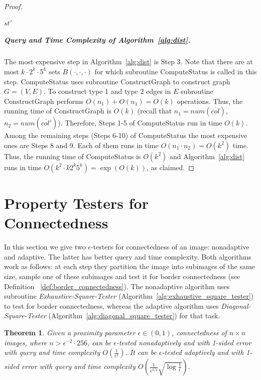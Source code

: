 \documentclass[11pt,english]{article}
\newtheorem{theorem}{Theorem}[section]
\numberwithin{figure}{section}
\newcommand{\eps}{{\epsilon}}
\newcommand{\Compst}{{\sf ComputeStatus}\xspace}
\newcommand{\Constgr}{{\sf ConstructGraph}\xspace}
\begin{document}
\begin{proof}
\begin{algorithm}
\nl \Return $\overline{st'}$

\end{algorithm}


\subparagraph{Query and Time Complexity of Algorithm~\ref{alg:dist}.}
The most expensive step in Algorithm~\ref{alg:dist} is Step 3. Note that there are at most $k\cdot2^k\cdot5^k$ sets $B(\cdot,\cdot,\cdot)$ for which subroutine \Compst is called in this step. \Compst uses subroutine \Constgr to construct graph $G=(V,E)$. To construct type 1 and type 2 edges in $E$ subroutine \Constgr performs $O(n_1)+O(n_1)=O(k)$ operations. Thus, the running time of \Constgr is $O(k)$ (recall that $n_1=num(\overline{col})$, $n_2=num(\overline{col'})$). Therefore, Steps 1-5 of \Compst run in time $O(k)$. Among the remaining steps (Steps 6-10) of \Compst the most expensive ones are Steps 8 and 9. Each of them runs in time $O(n_1\cdot n_2)=O(k^2)$ time. Thus, the running time of \Compst is $O(k^2)$ and Algorithm~\ref{alg:dist} runs in time $O( k^2\cdot k2^k5^k)=\exp \left (O(k)\right)$, as claimed.
\end{proof}



\iffalse
\section{Property Testers for Connectedness}\label{tester_for_connectedness}
In this section we give two $\eps$-testers
for connectedness of an image: nonadaptive and adaptive. The latter has better
query and time complexity. Both algorithms work as follows: at each step they
partition the image into subimages of the same size, sample one of these
subimages and test it for  border connectedness (see Definition~
\ref{def:border_connectedness}). The nonadaptive algorithm uses subroutine \emph{Exhaustive-Square-Tester}
(Algorithm~\ref{alg:exhaustive_square_tester}) to test for border connectedness, whereas the adaptive algorithm uses \emph{Diagonal-Square-Tester} (Algorithm~\ref{alg:diagonal_square_tester}) for that task.

 \begin{theorem}\label{thm:connectedness_tester}
Given a proximity parameter $\eps\in(0,1)$, connectedness of $n\times n$ images, where  $n>\eps^{-2}\cdot 256$, can be $\eps$-tested nonadaptively and with 1-sided error with query and time complexity $O(\frac{1}{\eps^{2}})$.
It can be $\eps$-tested adaptively and with 1-sided error with query and time complexity $O(\frac{1}{\eps^{3/2}} \sqrt{\log\frac{1}{\eps}})$.
\end{theorem}
\end{document}
